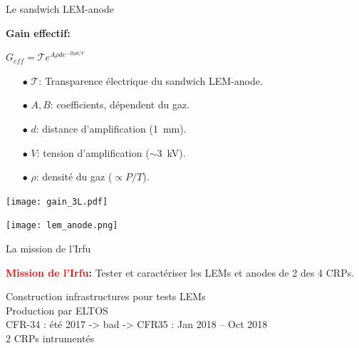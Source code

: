     \begin{frame}{Le sandwich LEM-anode}
	   		\begin{minipage}{0.48\textwidth}
	   			\begin{scriptsize}
		   			\textbf{Gain effectif:}\\
		   		\end{scriptsize}
	   			$G_{eff} = \mathcal{T}e^{A\rho d e^{-B\rho d/V}}$\\
	   			\begin{scriptsize}
	    			\begin{itemize}
	    				\item[$\bullet$] $\mathcal{T}$: Transparence électrique du sandwich LEM-anode.
	    				\item[$\bullet$] $A,B$: coefficients, dépendent du gaz.
	    				\item[$\bullet$] $d$: distance d'amplification (\SI{1}{\milli\meter}).
	    				\item[$\bullet$] $V$: tension d'amplification ($\sim$\SI{3}{\kilo\volt}).
	    				\item[$\bullet$] $\rho$: densité du gaz ($\propto P/T$).
	    			\end{itemize}
	    		\end{scriptsize} 
	   			\vfill
                \centering
				\texttt{[image: gain\_3L.pdf]}
	   		\end{minipage}\hfill
	   		\begin{minipage}{0.48\textwidth}
	   			\texttt{[image: lem\_anode.png]}
	   		\end{minipage}
    \end{frame}

    \begin{frame}{La mission de l'Irfu}
    	\begin{scriptsize}
            \textbf{\textcolor{red}{Mission de l'Irfu}: }Tester et caractériser les LEMs et anodes de 2 des 4 CRPs.\\\vfill
		\end{scriptsize}
        Construction infrastructures pour tests LEMs\\
        Production par ELTOS\\
        CFR-34 : été 2017 -> bad -> CFR35 : Jan 2018 -- Oct 2018\\
        2 CRPs intrumentés\\
    \end{frame}

